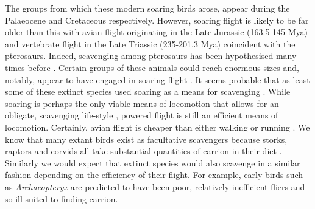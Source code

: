\documentclass[a4paper,12pt]{article}
\begin{document}
The groups from which these modern soaring birds arose, appear during the Palaeocene \citep[66 - 56 Million years ago (Mya); ][]{Jetz2012, Jarvis2014} and Cretaceous \citep{chiappe2006early} respectively.  %
However, soaring flight is likely to be far older than this with avian flight originating in the Late Jurassic (163.5-145 Mya) and vertebrate flight in the Late Triassic (235-201.3 Mya) coincident with the pterosaurs. 
Indeed, scavenging among pterosaurs has been hypothesised many times before \citep{witton2008reappraisal}. 
Certain groups of these animals could reach enormous sizes \citep[e.g. Azhdarchids with wingspans of 11 metres; ][]{witton2010size} and, notably, appear to have engaged in soaring flight \citep{witton2010size}.
It seems probable that as least some of these extinct species used soaring as a means for scavenging \citep{witton2013pterosaurs}. 
While soaring is perhaps the only viable means of locomotion that allows for an obligate, scavenging life-style \citep{ruxton2004obligate}, powered flight is still an efficient means of locomotion. 
Certainly, avian flight is cheaper than either walking or running \citep{tucker1975energetic}.
We know that many extant birds exist as facultative scavengers because storks, raptors and corvids all take substantial quantities of carrion in their diet \citep{kendall2013alternative}. 
Similarly we would expect that extinct species would also scavenge in a similar fashion depending on the efficiency of their flight. 
For example, early birds such as \textit{Archaeopteryx} are predicted to have been poor, relatively inefficient fliers \citep{nudds2010narrow} and so ill-suited to finding carrion. 
\end{document}
